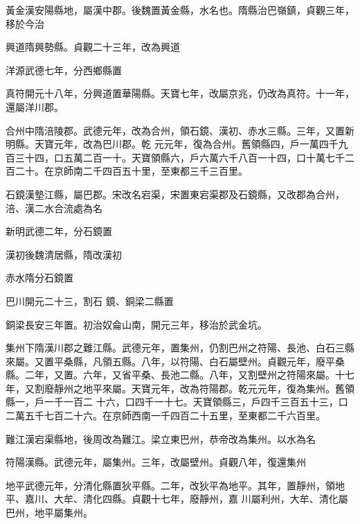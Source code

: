 \begin{pinyinscope}
 黃金漢安陽縣地，屬漢中郡。後魏置黃金縣，水名也。隋縣治巴嶺鎮，貞觀三年，移於今治



 興道隋興勢縣。貞觀二十三年，改為興道



 洋源武德七年，分西鄉縣置



 真符開元十八年，分興道置華陽縣。天寶七年，改屬京兆，仍改為真符。十一年，還屬洋川郡。



 合州中隋涪陵郡。武德元年，改為合州，領石鏡、漢初、赤水三縣。三年，又置新明縣。天寶元年，改為巴川郡。乾
 元元年，復為合州。舊領縣四，戶一萬四千九百三十四，口五萬二百一十。天寶領縣六，戶六萬六千八百一十四，口十萬七千二百二十。在京師南二千四百五十里，至東都三千三百里。



 石鏡漢墊江縣，屬巴郡。宋改名宕渠，宋置東宕渠郡及石鏡縣，又改郡為合州，涪、漢二水合流處為名



 新明武德二年，分石鏡置



 漢初後魏清居縣，隋改漢初



 赤水隋分石鏡置



 巴川開元二十三，割石
 鏡、銅梁二縣置



 銅梁長安三年置。初治奴侖山南，開元三年，移治於武金坑。



 集州下隋漢川郡之難江縣。武德元年，置集州，仍割巴州之符陽、長池、白石三縣來屬。又置平桑縣，凡領五縣。八年，以符陽、白石屬壁州。貞觀元年，廢平桑縣。二年，又置。六年，又省平桑、長池二縣。八年，又割壁州之符陽來屬。十七年，又割廢靜州之地平來屬。天寶元年，改為符陽郡。乾元元年，復為集州。舊領縣一，戶一千一百二
 十六，口四千一十七。天寶領縣三，戶四千三百五十三，口二萬五千七百二十六。在京師西南一千四百二十五里，至東都二千六百里。



 難江漢宕渠縣地，後周改為難江。梁立東巴州，恭帝改為集州。以水為名



 符陽漢縣。武德元年，屬集州。三年，改屬壁州。貞觀八年，復還集州



 地平武德元年，分清化縣置狄平縣。二年，改狄平為地平。其年，置靜州，領地平、嘉川、大牟、清化四縣。貞觀十七年，廢靜州，嘉
 川屬利州，大牟、清化屬巴州，地平屬集州。




\end{pinyinscope}
